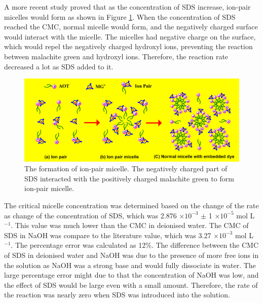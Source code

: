 \documentclass[twocolumn]{article} %
\begin{document}
A more recent study proved that as the concentration of SDS increase, ion-pair micelles would form as shown in Figure \ref{ion-pair micelle}.\cite{intro16} When the concentration of SDS reached the CMC, normal micelle would form, and the negatively charged surface would interact with the micelle. The micelles had negative charge on the surface, which would repel the negatively charged hydroxyl ions, preventing the reaction between malachite green and hydroxyl ions. Therefore, the reaction rate decreased a lot as SDS added to it. 

\begin{figure}[H]
    \centering
    \includegraphics[width=\columnwidth]{ion-pair micelle.png}
    \caption{The formation of ion-pair micelle. The negatively charged part of SDS interacted with the positively charged malachite green to form ion-pair micelle.\cite{intro}}
    \label{ion-pair micelle}
\end{figure}

The critical micelle concentration was determined based on the change of the rate as change of the concentration of SDS, which was 2.876 $\times 10^{-3}$ $\pm$ 1 $\times 10^{-5}$ mol L$^{-1}$. This value was much lower than the CMC in deionised water. The CMC of SDS in NaOH was compare to the literature value, which was 3.27 $\times 10^{-3}$ mol L$^{-1}$.\cite{intro} The percentage error was calculated as 12\%. The difference between the CMC of SDS in deionised water and NaOH was due to the presence of more free ions in the solution as NaOH was a strong base and would fully dissociate in water. The large percentage error might due to that the concentration of NaOH was low, and the effect of SDS would be large even with a small amount. Therefore, the rate of the reaction was nearly zero when SDS was introduced into the solution. 
\end{document}
